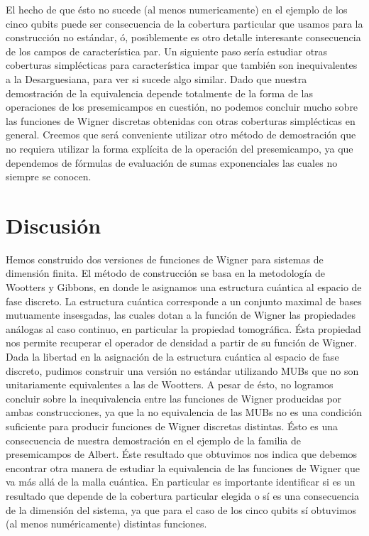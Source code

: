 \documentclass[a4paper,11pt]{report}
\begin{document}
  El hecho de que ésto no sucede (al menos numericamente) en
  el ejemplo de los cinco qubits puede ser consecuencia de
  la cobertura particular que usamos para la construcción no
  estándar, ó, posiblemente es otro detalle interesante
  consecuencia de los campos de característica par. Un
  siguiente paso sería estudiar otras coberturas
  simplécticas para característica impar que también son
  inequivalentes a la Desarguesiana, para ver si sucede algo
  similar. Dado que nuestra demostración de la equivalencia
  depende totalmente de la forma de las operaciones de los
  presemicampos en cuestión, no podemos concluir mucho sobre
  las funciones de Wigner discretas obtenidas con otras
  coberturas simplécticas en general.  Creemos que será
  conveniente utilizar otro método de demostración que no
  requiera utilizar la forma explícita de la operación del
  presemicampo, ya que dependemos de fórmulas de evaluación
  de sumas exponenciales las cuales no siempre se conocen.
  

  \clearpage
  \section{Discusión}

  Hemos construido dos versiones de funciones de Wigner para
  sistemas de dimensión finita. El método de construcción se
  basa en la metodología de Wootters y Gibbons, en donde le
  asignamos una estructura cuántica al espacio de fase
  discreto. La estructura cuántica corresponde a un conjunto
  maximal de bases mutuamente insesgadas, las cuales dotan a
  la función de Wigner las propiedades análogas al caso
  continuo, en particular la propiedad tomográfica.
  Ésta propiedad nos permite recuperar el operador de
  densidad a partir de su función de Wigner. Dada la
  libertad en la asignación de la estructura cuántica al
  espacio de fase discreto, pudimos construir una versión no
  estándar utilizando MUBs que no son unitariamente
  equivalentes a las de Wootters. A pesar de ésto, no
  logramos concluir sobre la inequivalencia entre las
  funciones de Wigner producidas por ambas construcciones,
  ya que la no equivalencia de las MUBs no es una condición
  suficiente para producir funciones de Wigner discretas
  distintas. Ésto es una consecuencia de nuestra
  demostración en el ejemplo de la familia de presemicampos
  de Albert. Éste resultado que obtuvimos nos indica que
  debemos encontrar otra manera de estudiar la equivalencia
  de las funciones de Wigner que va más allá de la malla
  cuántica. En particular es importante identificar si es un
  resultado que depende de la cobertura particular elegida o
  sí es una consecuencia de la dimensión del sistema, ya que
  para el caso de los cinco qubits sí obtuvimos (al menos
  numéricamente) distintas funciones.
\end{document}
